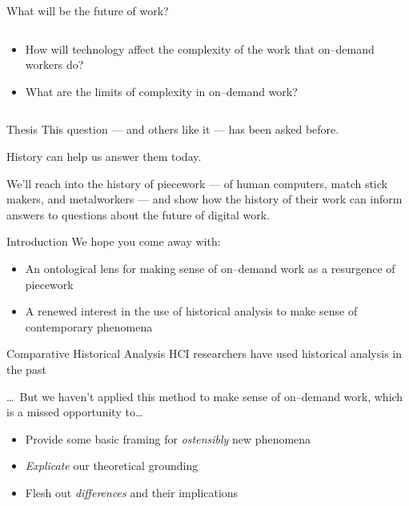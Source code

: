 \documentclass[presentation]{subfiles}
\begin{document}
\begin{frame}{What will be the future of work?}
  \begin{columns}
    \begin{column}{0.6\textwidth}
      \begin{itemize}
        \item<1-> How will \alert{technology} affect the complexity of the work that on--demand workers do?
        \item<2-> What are the \alert{limits} of complexity in on--demand work?
      \end{itemize}
    \end{column}
    \begin{column}{0.4\textwidth}
    \end{column}
    \end{columns}
\end{frame}


\begin{frame}{Thesis}
    This question --- and others like it --- has been asked before.

    History can help us answer them today.

    We'll reach into the history of \alert{piecework}
    --- of human computers, match stick makers, and metalworkers ---
    and show how the \alert{history} of their work can
    inform answers to questions about the \alert{future} of digital work.
\end{frame}

\begin{frame}{Introduction}
  We hope you come away with:
      \begin{itemize}
        \item An \alert{ontological lens} for making sense of on--demand work as a resurgence of piecework
        \item A renewed interest in the use of \alert{historical analysis} to make sense of contemporary phenomena
      \end{itemize}
\end{frame}


\begin{frame}{Comparative Historical Analysis}
  HCI researchers have used historical analysis in the past\par
  \scriptsize{\textcite{Wyche2006,bodker1993historical}\par}\normalsize{}
  
  \dots~But we haven't applied this method to make sense of on--demand work,
        which is a missed opportunity to\dots
  \begin{itemize}
    \item Provide some basic framing for \emph{ostensibly} new phenomena
    \item \emph{Explicate} our theoretical grounding
    \item Flesh out \emph{differences} and their implications
  \end{itemize}
\end{frame}

\notinsubfile{
  
}
\end{document}

